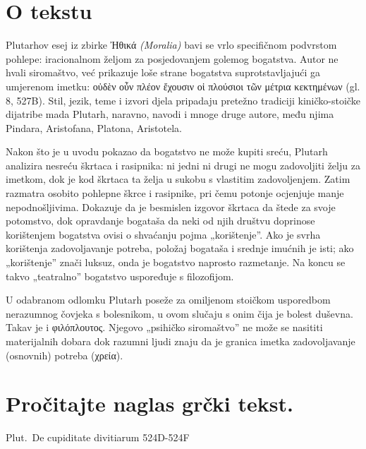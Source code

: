 


\section*{O tekstu}

Plutarhov esej iz zbirke Ἠθικά \textit{(Moralia)} bavi se vrlo specifičnom podvrstom pohlepe: iracionalnom željom za posjedovanjem golemog bogatstva. Autor ne hvali siromaštvo, već prikazuje loše strane bogatstva suprotstavljajući ga umjerenom imetku: \textgreek[variant=ancient]{οὐδὲν οὖν πλέον ἔχουσιν οἱ πλούσιοι τῶν μέτρια κεκτημένων} (gl. 8, 527B). Stil, jezik, teme i izvori djela pripadaju pretežno tradiciji kiničko-stoičke dijatribe mada Plutarh, naravno, navodi i mnoge druge autore, među njima Pindara, Aristofana, Platona, Aristotela.

Nakon što je u uvodu pokazao da bogatstvo ne može kupiti sreću, Plutarh analizira nesreću škrtaca i rasipnika: ni jedni ni drugi ne mogu zadovoljiti želju za imetkom, dok je kod škrtaca ta želja u sukobu s vlastitim zadovoljenjem. Zatim razmatra osobito pohlepne škrce i rasipnike, pri čemu potonje ocjenjuje manje nepodnošljivima. Dokazuje da je besmislen izgovor škrtaca da štede za svoje potomstvo, dok opravdanje bogataša da neki od njih društvu doprinose korištenjem bogatstva ovisi o shvaćanju pojma „korištenje”. Ako je svrha korištenja zadovoljavanje potreba, položaj bogataša i srednje imućnih je isti; ako „korištenje” znači luksuz, onda je bogatstvo naprosto razmetanje. Na koncu se takvo „teatralno” bogatstvo uspoređuje s filozofijom.

U odabranom odlomku Plutarh poseže za omiljenom stoičkom usporedbom nerazumnog čovjeka s bolesnikom, u ovom slučaju s onim čija je bolest duševna. Takav je i \textgreek[variant=ancient]{φιλόπλουτος.} Njegovo „psihičko siromaštvo” ne može se nasititi materijalnih dobara dok razumni ljudi znaju da je granica imetka zadovoljavanje (osnovnih) potreba \textgreek[variant=ancient]{(χρεία).}


\section*{Pročitajte naglas grčki tekst.}

Plut.\ De cupiditate divitiarum 524D-524F


